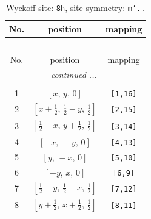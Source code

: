 \documentclass[fleqn,8pt]{jsarticle}
\begin{document}
\begin{longtable}{ccc}
\caption{Wyckoff site: {\tt 8h}, site symmetry: {\tt m'..}}
 \\
 \hline \hline
No. & position & mapping \\ \hline \endfirsthead

\multicolumn{2}{l}{\tablename\ \thetable{}} \\
 \hline \hline
No. & position & mapping \\ \hline \endhead

 \hline \hline
\multicolumn{2}{r}{\footnotesize\it continued ...} \\ \endfoot

 \hline \hline
\multicolumn{2}{r}{} \\ \endlastfoot

1 & $\left[ x,\, y,\, 0 \right]$ & {\tt [1,16]} \\ \hline
2 & $\left[ x + \frac{1}{2},\, \frac{1}{2} - y,\, \frac{1}{2} \right]$ & {\tt [2,15]} \\ \hline
3 & $\left[ \frac{1}{2} - x,\, y + \frac{1}{2},\, \frac{1}{2} \right]$ & {\tt [3,14]} \\ \hline
4 & $\left[ - x,\, - y,\, 0 \right]$ & {\tt [4,13]} \\ \hline
5 & $\left[ y,\, - x,\, 0 \right]$ & {\tt [5,10]} \\ \hline
6 & $\left[ - y,\, x,\, 0 \right]$ & {\tt [6,9]} \\ \hline
7 & $\left[ \frac{1}{2} - y,\, \frac{1}{2} - x,\, \frac{1}{2} \right]$ & {\tt [7,12]} \\ \hline
8 & $\left[ y + \frac{1}{2},\, x + \frac{1}{2},\, \frac{1}{2} \right]$ & {\tt [8,11]} \\
\end{longtable}
\renewcommand{\arraystretch}{1.2}
\end{document}
